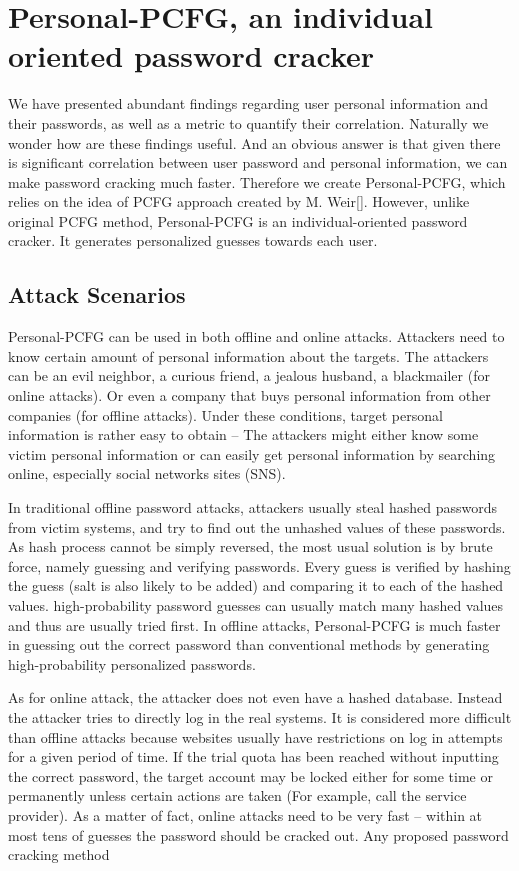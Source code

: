 \documentclass{sig-alternate}
\begin{document}
\section{Personal-PCFG, an individual oriented password cracker}
\label{personalpcfg}
We have presented abundant findings regarding user personal information and their passwords, as well as a metric to quantify their correlation. Naturally we wonder how are these findings useful. And an obvious answer is that given there is significant correlation between user password and personal information, we can make password cracking much faster. Therefore we create Personal-PCFG, which relies on the idea of PCFG approach created by M. Weir[]. However, unlike original PCFG method, Personal-PCFG is an individual-oriented password cracker. It generates personalized guesses towards each user.

\subsection{Attack Scenarios}
Personal-PCFG can be used in both offline and online attacks. Attackers need to know certain amount of personal information about the targets. The attackers can be an evil neighbor, a curious friend, a jealous husband, a blackmailer (for online attacks). Or even a company that buys personal information from other companies (for offline attacks). Under these conditions, target personal information is rather easy to obtain -- The attackers might either know some victim personal information or can easily get personal information by searching online, especially social networks sites (SNS). 

In traditional offline password attacks, attackers usually steal hashed passwords from victim systems, and try to find out the unhashed values of these passwords. As hash process cannot be simply reversed, the most usual solution is by brute force, namely guessing and verifying passwords. Every guess is verified by hashing the guess (salt is also likely to be added) and comparing it to each of the hashed values. high-probability password guesses can usually match many hashed values and thus are usually tried first. In offline attacks, Personal-PCFG is much faster in guessing out the correct password than conventional methods by generating high-probability personalized passwords.

As for online attack, the attacker does not even have a hashed database. Instead the attacker tries to directly log in the real systems. It is considered more difficult than offline attacks because websites usually have restrictions on log in attempts for a given period of time. If the trial quota has been reached without inputting the correct password, the target account may be locked either for some time or permanently unless certain actions are taken (For example, call the service provider). As a matter of fact, online attacks need to be very fast -- within at most tens of guesses the password should be cracked out. Any proposed password cracking method 
\end{document}
